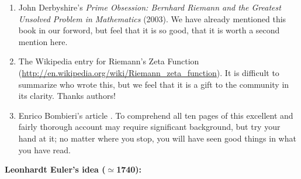 \documentclass[openany]{book}
\theoremstyle{plain}
\theoremstyle{definition}
\begin{document}
{{ \begin{enumerate}
 \item John Derbyshire's {\it Prime Obsession: Bernhard Riemann and
     the Greatest Unsolved Problem in Mathematics} (2003).  We have already
   mentioned this book in our forword, but feel that it is so
   good, that it is worth a second mention here.
 \item The Wikipedia entry for Riemann's Zeta Function
   (\url{http://en.wikipedia.org/wiki/Riemann\_zeta\_function}). It is
   difficult to summarize who wrote this, but we feel that it is a
   gift to the community in its clarity. Thanks authors!
 \item Enrico Bombieri's article .
   To comprehend all ten pages of this excellent and fairly thorough
   account may require significant background, but try your hand at
   it; no matter where you stop, you will have seen good things in
   what you have read.
\end{enumerate}
\vskip20pt
{\bf Leonhardt Euler's idea ($\simeq$1740):}

}}
\end{document}

